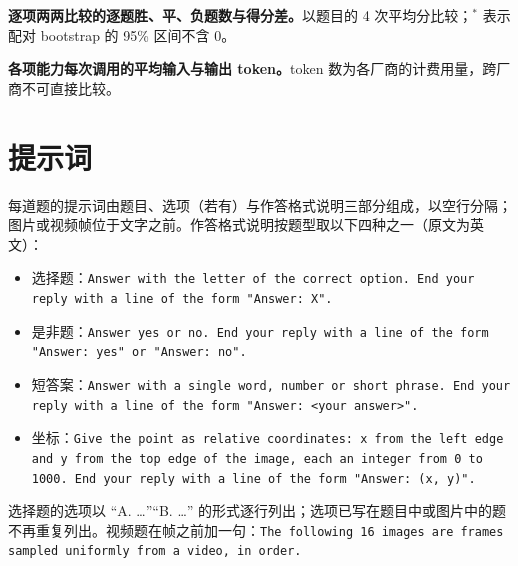 \documentclass[11pt,a4paper,fontset=none]{ctexart}
\begin{document}
\begin{table}[H]
  \centering
  \caption{\textbf{逐项两两比较的逐题胜、平、负题数与得分差。}以题目的 4 次平均分比较；$^{*}$ 表示配对 bootstrap 的 95\% 区间不含 0。}
  \label{tab:wtl}
  \small
  \begin{adjustbox}{max width=\linewidth}\end{adjustbox}
\end{table}

\begin{table}[H]
  \centering
  \caption{\textbf{各项能力每次调用的平均输入与输出 token。}token 数为各厂商的计费用量，跨厂商不可直接比较。}
  \label{tab:tokcap}
  \small
  \begin{adjustbox}{max width=\linewidth}\end{adjustbox}
\end{table}

\section{提示词}
\label{app:prompts}

每道题的提示词由题目、选项（若有）与作答格式说明三部分组成，以空行分隔；图片或视频帧位于文字之前。作答格式说明按题型取以下四种之一（原文为英文）：

{\raggedright
\begin{itemize}[leftmargin=1.6em]
  \item 选择题：\texttt{Answer with the letter of the correct option. End your reply with a line of the form "Answer: X".}
  \item 是非题：\texttt{Answer yes or no. End your reply with a line of the form "Answer: yes" or "Answer: no".}
  \item 短答案：\texttt{Answer with a single word, number or short phrase. End your reply with a line of the form "Answer: <your answer>".}
  \item 坐标：\texttt{Give the point as relative coordinates: x from the left edge and y from the top edge of the image, each an integer from 0 to 1000. End your reply with a line of the form "Answer: (x, y)".}
\end{itemize}
\par}

选择题的选项以 “A. …”“B. …” 的形式逐行列出；选项已写在题目中或图片中的题不再重复列出。视频题在帧之前加一句：\texttt{The following 16 images are frames sampled uniformly from a video, in order.}
\end{document}
